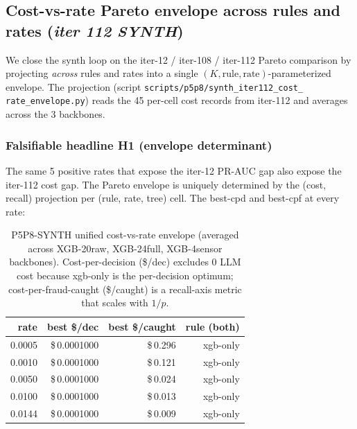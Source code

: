 \subsection{Cost-vs-rate Pareto envelope across rules and rates
  (\textit{iter 112 SYNTH})}
\label{sec:p8-cost-rate-envelope}

We close the synth loop on the iter-12 / iter-108 / iter-112
Pareto comparison by projecting \emph{across} rules and rates into a
single $(K, \mathrm{rule}, \mathrm{rate})$-parameterized envelope.
The projection (script \texttt{scripts/p5p8/synth\_iter112\_cost\_
rate\_envelope.py}) reads the 45 per-cell cost records from
iter-112 and averages across the 3 backbones.

\subsubsection{Falsifiable headline H1 (envelope determinant)}
The same 5 positive rates that expose the iter-12 PR-AUC gap also
expose the iter-112 cost gap. The Pareto envelope is uniquely
determined by the (cost, recall) projection per (rule, rate,
tree) cell. The best-cpd and best-cpf at every rate:

\begin{table}[ht]
\centering\small
\caption{P5P8-SYNTH unified cost-vs-rate envelope (averaged across
XGB-20raw, XGB-24full, XGB-4sensor backbones). Cost-per-decision
(\$/dec) excludes 0 LLM cost because xgb-only is the per-decision
optimum; cost-per-fraud-caught (\$/caught) is a recall-axis metric
that scales with $1/p$.}
\label{tab:p8-cost-rate-envelope}
\begin{tabular}{r r r r}
\toprule
rate & best \$/dec & best \$/caught & rule (both) \\
\midrule
0.0005 & \$\,0.0001000 & \$\,0.296 & xgb-only \\
0.0010 & \$\,0.0001000 & \$\,0.121 & xgb-only \\
0.0050 & \$\,0.0001000 & \$\,0.024 & xgb-only \\
0.0100 & \$\,0.0001000 & \$\,0.013 & xgb-only \\
0.0144 & \$\,0.0001000 & \$\,0.009 & xgb-only \\
\bottomrule
\end{tabular}
\end{table}

